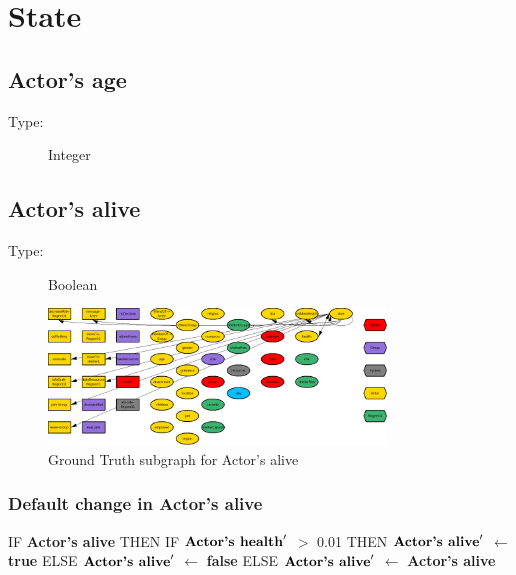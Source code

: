 \documentclass{article}%
\begin{document}
%
\section{State}%
\label{sec:State}%
\subsection{Actor's age}%
\label{subsec:Actor's age}%
\begin{description}%
\item[Type:]%
Integer%
\end{description}

%
\subsection{Actor's alive}%
\label{subsec:Actor's alive}%
\begin{description}%
\item[Type:]%
Boolean%
\end{description}%


\begin{figure}[ht]%
\centering%
\includegraphics[width=0.8\textwidth]{images/aliveOfActor.png}%
\caption{Ground Truth subgraph for Actor's alive}%
\end{figure}

%
\subsubsection{Default change in Actor's alive}%
\label{ssubsec:Default change in Actor's alive}%
\begin{flushleft}%
IF %
\textbf{Actor's alive}%
\linebreak%
\hspace*{2em}%
THEN %
IF %
$\mbox{\textbf{Actor's health}} '$%
$>$%
0.01%
\linebreak%
\hspace*{4em}%
THEN %
$\mbox{\textbf{Actor's alive}} '$%
$\leftarrow$%
\textbf{true}%
\linebreak%
\hspace*{4em}%
ELSE %
$\mbox{\textbf{Actor's alive}} '$%
$\leftarrow$%
\textbf{false}%
\linebreak%
\hspace*{2em}%
ELSE %
$\mbox{\textbf{Actor's alive}} '$%
$\leftarrow$%
\textbf{Actor's alive}%
\end{flushleft}
\end{document}
